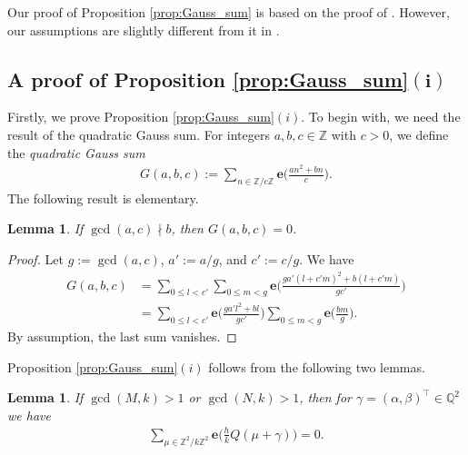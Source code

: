 \documentclass[11pt]{article}
\numberwithin{equation}{section}
\newcommand{\Z}{\mathbb{Z}}
\newcommand{\Q}{\mathbb{Q}}
\numberwithin{equation}{section}
\newtheorem{lem}[Theorem]{Lemma}
\newcommand{\trans}[1]{#1^\top}
\begin{document}
Our proof of Proposition \ref{prop:Gauss_sum} is based on the proof of \cite[Theorem 4.1]{BMM}.
However, our assumptions are slightly different from it in \cite[Theorem 4.1]{BMM}.


\subsection[A proof of Proposition 4.2(i)]
{A proof of Proposition \ref{prop:Gauss_sum}$\boldsymbol{(i)}$}%


Firstly, we prove Proposition \ref{prop:Gauss_sum}$(i)$.
To begin with, we need the result of the quadratic Gauss sum.
For integers $ a, b, c \in \Z $ with $ c > 0 $, we define the \textit{quadratic Gauss sum}
\begin{gather*}
G(a, b, c) := \sum_{n \in \Z/c\Z} \bm{e} \bigg(\frac{an^2 + bn}{c}\bigg).
\end{gather*}
The following result is elementary.

\begin{lem} \label{lem:Gauss_sum_fundamental}
	If $ \gcd(a, c) \nmid b $, then $ G(a, b, c) = 0 $.
\end{lem}

\begin{proof}
	Let $g := \gcd(a, c)$, $a' := a/g$, and $c' := c/g$.
	We have
	\begin{align*}
G(a, b, c)
&= \sum_{0 \le l < c'} \sum_{0 \le m < g} \bm{e} \bigg( \frac{ga'(l+c'm)^2 + b(l+c'm)}{gc'} \bigg)
\\
&= \sum_{0 \le l < c'} \bm{e} \bigg( \frac{ga' l^2 + bl}{gc'} \bigg) \sum_{0 \le m < g} \bm{e}
\bigg(\frac{bm}{g} \bigg).
	\end{align*}
	By assumption, the last sum vanishes.
\end{proof}

Proposition \ref{prop:Gauss_sum}$(i)$ follows from the following two lemmas.

\begin{lem} \label{lem:Gauss_sum_zero_general}
	If $ \gcd(M, k) > 1 $ or $ \gcd(N, k) > 1 $, then for $ \gamma = \trans{(\alpha, \beta)} \in \Q^2 $ we have
	\begin{gather*}
	\sum_{\mu \in \Z^2/k\Z^2} \bm{e}\bigg( \frac{h}{k} Q(\mu + \gamma) \bigg)
	= 0.
	\end{gather*}
\end{lem}
\end{document}
